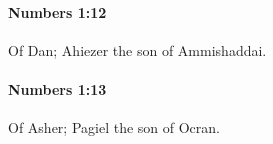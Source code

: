		\paragraph{Numbers 1:12} %
			\label{NUMBERS-1-12}

			Of Dan; Ahiezer the son of Ammishaddai.


		\paragraph{Numbers 1:13} %
			\label{NUMBERS-1-13}

			Of Asher; Pagiel the son of Ocran.


